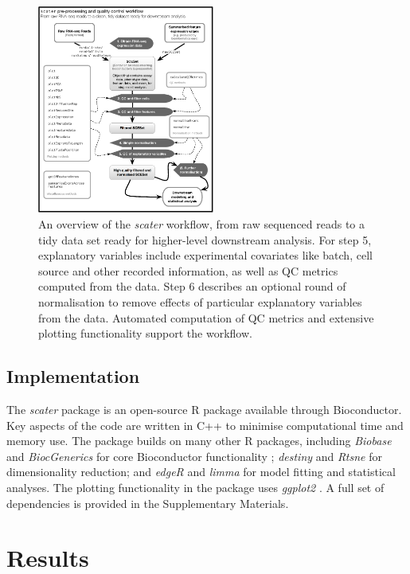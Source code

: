 \documentclass[10pt,letterpaper]{article}
\begin{document}
\begin{figure}[tpb]%
\centerline{\includegraphics[width=0.52\textwidth]{scater_qc_workflow}}
\caption{\small An overview of the \emph{scater} workflow, from raw sequenced reads to a tidy data set ready for higher-level downstream analysis. For step 5, explanatory variables include experimental covariates like batch, cell source and other recorded information, as well as QC metrics computed from the data. Step 6 describes an optional round of normalisation to remove effects of particular explanatory variables from the data. Automated computation of QC metrics and extensive plotting functionality support the workflow.}\label{fig:01}
\end{figure}


\subsection*{Implementation}\label{implementation}

The \emph{scater} package is an open-source R package available through     Bioconductor. Key aspects of the code are written in C++ to minimise computational time and memory use. The package builds on many other R packages, including \emph{Biobase} and \emph{BiocGenerics} for core Bioconductor functionality \citep{Huber2015-en}; \emph{destiny} \citep{Angerer2015-sw} and \emph{Rtsne} for dimensionality reduction; and \emph{edgeR} \citep{Robinson2010-ky} and \emph{limma} \citep{Ritchie2015-so} for model fitting and statistical analyses. The plotting functionality in the package uses \emph{ggplot2} \citep{Wickham2016-dc}. A full set of dependencies is provided in the Supplementary Materials.


\section*{Results}\label{results}
\end{document}
